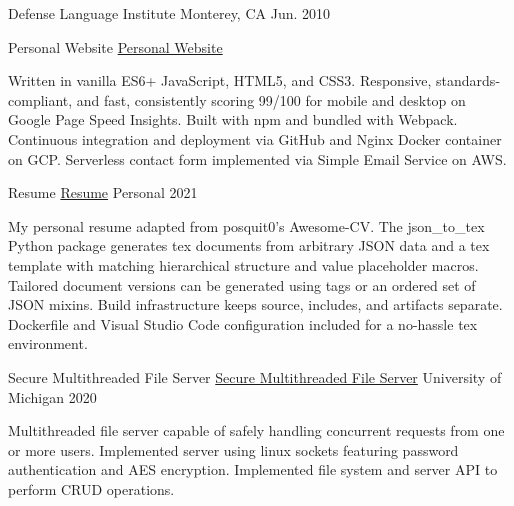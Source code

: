 \documentclass[11pt, a4paper]{cv}
\newenvironment{projects}{}{\par}
\newenvironment{education}{}{\par}
\newenvironment{cv}{}{\par}
\newenvironment{degrees}{\begin{separatedItems}{\headerSocialSep}}{\end{separatedItems}}
\renewcommand{\headerSocialSep}{\quad\textbar\quad}
\begin{document}
\begin{cv}
\begin{education}
\begin{cventries}
{\begin{degrees}
\end{degrees}}
{Defense Language Institute}
{Monterey, CA}
{Jun. 2010}
{\begin{cvitems}
\end{cvitems}}
\end{cventries}
\end{education}
\begin{projects}
\begin{cventries}
\cventrycompact
{
{Personal Website}
{\color{hrefblue}\href{https://brandon.mosher.xyz}{Personal Website}}}
{}
{}
{}
{\begin{cvparagraph}
Written in vanilla ES6+ JavaScript, HTML5, and CSS3. Responsive, standards-compliant, and fast, consistently scoring 99/100 for mobile and desktop on Google Page Speed Insights. Built with npm and bundled with Webpack. Continuous integration and deployment via GitHub and Nginx Docker container on GCP. Serverless contact form implemented via Simple Email Service on AWS.
\end{cvparagraph}}
\cventrycompact
{
{Resume}
{\color{hrefblue}\href{https://github.com/brandonmosher/resume}{Resume}}}
{}
{Personal}
{2021}
{\begin{cvparagraph}
My personal resume adapted from posquit0's Awesome-CV. The json\_to\_tex Python package generates tex documents from arbitrary JSON data and a tex template with matching hierarchical structure and value placeholder macros. Tailored document versions can be generated using tags or an ordered set of JSON mixins. Build infrastructure keeps source, includes, and artifacts separate. Dockerfile and Visual Studio Code configuration included for a no-hassle tex environment.
\end{cvparagraph}}
\cventrycompact
{\ifstrempty{}
{Secure Multithreaded File Server}
{\color{hrefblue}\href{}{Secure Multithreaded File Server}}}
{}
{University of Michigan}
{2020}
{\begin{cvparagraph}
Multithreaded file server capable of safely handling concurrent requests from one or more users. Implemented server using linux sockets featuring password authentication and AES encryption. Implemented file system and server API to perform CRUD operations.

\end{cvparagraph}}
\end{cventries}
\end{projects}
\end{cv}
\end{document}
